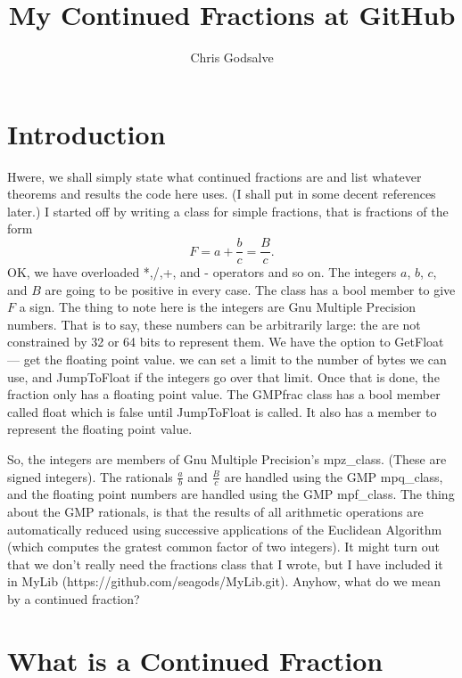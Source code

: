 \documentclass[16pt]{article}
\numberwithin{equation}{section}
\numberwithin{figure}{section}
\numberwithin{figure}{section}
\numberwithin{equation}{section}
\begin{document}
\thispagestyle{empty}

\title{My Continued Fractions at GitHub}
\author{Chris Godsalve}
\maketitle

\tableofcontents

\section{Introduction}

Hwere, we shall simply state what continued fractions are and list whatever theorems and results
the code here uses. (I shall put in some decent references later.)
I started off by writing a class for simple fractions, that is fractions
of the form 
\begin{equation}
F=a+\frac{b}{c}=\frac{B}{c}.
\end{equation}
OK, we have overloaded *,/,+, and - operators and so on. The integers $a$, $b$, $c$, and $B$
 are going to be positive in every case. The class has a bool member to give $F$ a sign.
The thing to note here is the integers are Gnu Multiple Precision numbers. That is to say, these numbers
can be arbitrarily large: the are not constrained by 32 or 64 bits to represent them.
We have the option to GetFloat --- get the floating point value. we can set a limit to the number
 of bytes we can use, and JumpToFloat if the integers go over that limit. Once 
that is done, the fraction only has a floating point value. The GMPfrac class
has a bool member called float which is false until JumpToFloat is called. It also
has a member to represent the floating point value.

So, the integers are members of Gnu Multiple Precision's {mpz\_class}. (These are signed integers).
The rationals $\frac{a}{b}$  and $\frac{B}{c}$ are handled using the GMP {mpq\_class}, and the
floating point numbers are handled using the GMP {mpf\_class}. The thing about the GMP rationals, is
 that the results of all arithmetic operations are automatically reduced using successive applications
of  the Euclidean Algorithm (which computes the gratest common factor of two integers).
It might turn out that we don't really need the fractions class that I wrote, but I have included it
in MyLib (https://github.com/seagods/MyLib.git). Anyhow, what do we mean by a continued fraction?

\section{What is a Continued Fraction}
\end{document}
